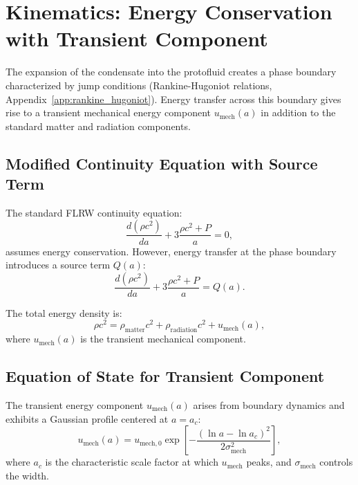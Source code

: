 \documentclass[11pt,a4paper]{article}
\newcommand{\umech}{\ensuremath{u_{\mathrm{mech}}}}
\theoremstyle{definition}
\theoremstyle{remark}
\begin{document}
\section{Kinematics: Energy Conservation with Transient Component}
\label{sec:kinematics}

The expansion of the condensate into the protofluid creates a phase boundary characterized by jump conditions (Rankine-Hugoniot relations, Appendix~\ref{app:rankine_hugoniot}). Energy transfer across this boundary gives rise to a transient mechanical energy component $\umech(a)$ in addition to the standard matter and radiation components.

\subsection{Modified Continuity Equation with Source Term}
\label{sec:continuity_source}

The standard FLRW continuity equation:
\begin{equation}
\label{eq:continuity_standard}
\frac{d(\rho c^2)}{da} + 3\frac{\rho c^2 + P}{a} = 0,
\end{equation}
assumes energy conservation. However, energy transfer at the phase boundary introduces a source term $Q(a)$:
\begin{equation}
\label{eq:continuity_modified}
\boxed{\frac{d(\rho c^2)}{da} + 3\frac{\rho c^2 + P}{a} = Q(a).}
\end{equation}

The total energy density is:
\begin{equation}
\rho c^2 = \rho_{\mathrm{matter}}c^2 + \rho_{\mathrm{radiation}}c^2 + \umech(a),
\end{equation}
where $\umech(a)$ is the transient mechanical component.

\subsection{Equation of State for Transient Component}
\label{sec:wmech_derivation}

The transient energy component $\umech(a)$ arises from boundary dynamics and exhibits a Gaussian profile centered at $a = a_c$:
\begin{equation}
\label{eq:umech_profile}
\umech(a) = u_{\mathrm{mech},0} \exp\left[-\frac{(\ln a - \ln a_c)^2}{2\sigma_{\mathrm{mech}}^2}\right],
\end{equation}
where $a_c$ is the characteristic scale factor at which $\umech$ peaks, and $\sigma_{\mathrm{mech}}$ controls the width.
\end{document}
